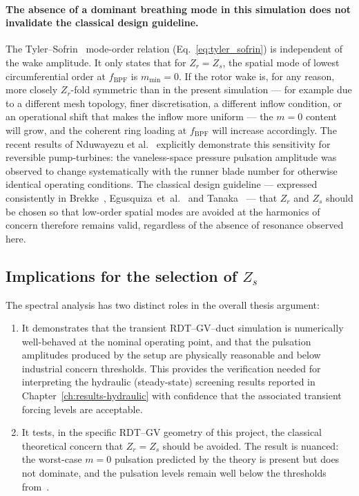\paragraph{The absence of a dominant breathing mode in this
simulation does not invalidate the classical design guideline.}
The Tyler--Sofrin~\cite{tyler1962} mode-order relation
(Eq.~\eqref{eq:tyler_sofrin}) is independent of the wake amplitude.
It only states that for $Z_r = Z_s$, the spatial mode of lowest
circumferential order at $f_{\mathrm{BPF}}$ is $m_{\min} = 0$. If
the rotor wake is, for any reason, more closely $Z_r$-fold
symmetric than in the present simulation --- for example due to a
different mesh topology, finer discretisation, a different inflow
condition, or an operational shift that makes the inflow more
uniform --- the $m=0$ content will grow, and the coherent ring
loading at $f_{\mathrm{BPF}}$ will increase accordingly. The recent
results of Nduwayezu et al.~\cite{nduwayezu2021} explicitly
demonstrate this sensitivity for reversible pump-turbines: the
vaneless-space pressure pulsation amplitude was observed to change
systematically with the runner blade number for otherwise identical
operating conditions. The classical design guideline --- expressed
consistently in Brekke~\cite{brekke,brekke2010},
Egusquiza~et~al.~\cite{egusquiza2006} and
Tanaka~\cite{tanaka2011} --- that $Z_r$ and $Z_s$ should be chosen
so that low-order spatial modes are avoided at the harmonics of
concern therefore remains valid, regardless of the absence of
resonance observed here.

\subsection{Implications for the selection of $Z_s$}
\label{sec:results-fft-implications}

The spectral analysis has two distinct roles in the overall thesis
argument:
\begin{enumerate}
  \item It demonstrates that the transient \ac{RDT}--\ac{GV}--duct
        simulation is numerically well-behaved at the nominal
        operating point, and that the pulsation amplitudes produced
        by the setup are physically reasonable and below industrial
        concern thresholds. This provides the verification needed
        for interpreting the hydraulic (steady-state) screening
        results reported in Chapter~\ref{ch:results-hydraulic} with
        confidence that the associated transient forcing levels are
        acceptable.
  \item It tests, in the specific \ac{RDT}--\ac{GV} geometry of this
        project, the classical theoretical concern that
        $Z_r = Z_s$ should be avoided. The result is nuanced: the
        worst-case $m=0$ pulsation predicted by the theory is
        present but does not dominate, and the pulsation levels
        remain well below the thresholds
        from~\cite{brekke,brekke2010}.
\end{enumerate}

